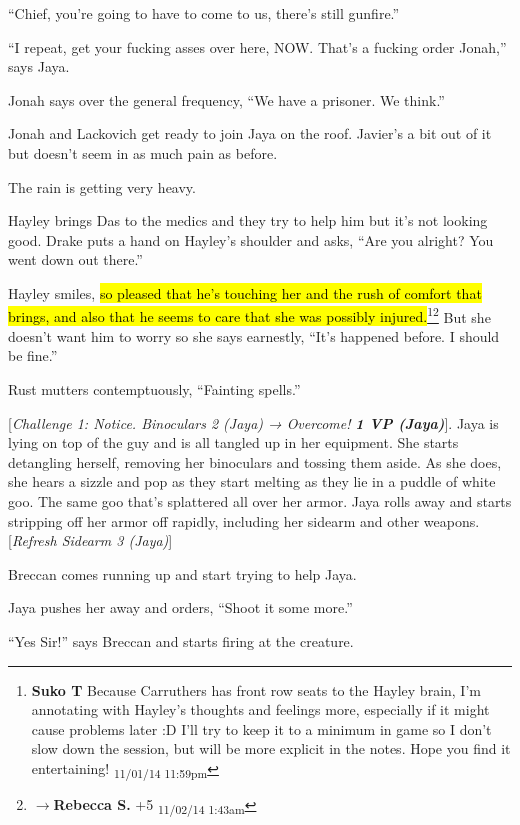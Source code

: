``Chief, you're going to have to come to us, there's still gunfire.''

``I repeat, get your fucking asses over here, NOW.  That's a fucking order Jonah,'' says Jaya.

Jonah says over the general frequency, ``We have a prisoner.  We think.''

Jonah and Lackovich get ready to join Jaya on the roof.  Javier's a bit out of it but doesn't seem in as much pain as before.

The rain is getting very heavy.



Hayley brings Das to the medics and they try to help him but it's not looking good.  Drake puts a hand on Hayley's shoulder and asks, ``Are you alright?  You went down out there.''

Hayley smiles, \hl{so pleased that he's touching her and the rush of comfort that brings, and also that he seems to care that she was possibly injured.}\footnote{\textbf{Suko T }Because Carruthers has front row seats to the Hayley brain, I'm annotating with Hayley's thoughts and feelings more, especially if it might cause problems later :D  I'll try to keep it to a minimum in game so I don't slow down the session, but will be more explicit in the notes.  Hope you find it entertaining! \textsubscript{11/01/14 11:59pm}}\footnote{$\rightarrow$\textbf{Rebecca S. }+5 \textsubscript{11/02/14 1:43am}} But she doesn't want him to worry so she says earnestly, ``It's happened before.  I should be fine.''

Rust mutters contemptuously, ``Fainting spells.''



{[}\textit{Challenge 1: Notice.  Binoculars 2 (Jaya) → Overcome! }\textit{\textbf{1 VP (Jaya)}}{]}.  Jaya is lying on top of the guy and is all tangled up in her equipment.  She starts detangling herself, removing her binoculars and tossing them aside.  As she does, she hears a sizzle and pop as they start melting as they lie in a puddle of white goo.  The same goo that's splattered all over her armor.  Jaya rolls away and starts stripping off her armor off rapidly, including her sidearm and other weapons.   {[}\textit{Refresh Sidearm 3 (Jaya)}{]}

Breccan comes running up and start trying to help Jaya.

Jaya pushes her away and orders, ``Shoot it some more.''

``Yes Sir!'' says Breccan and starts firing at the creature.

